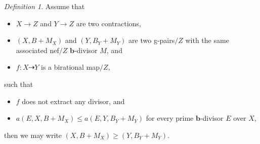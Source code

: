\documentclass[11pt]{amsart}
\numberwithin{equation}{section}
\newcommand{\bb}{\bm{b}}
\theoremstyle{definition}
\theoremstyle{remark}
\newtheorem{defn}[thm]{Definition}
\theoremstyle{definition}
\begin{document}
\begin{defn}
Assume that
\begin{itemize}
    \item $X\rightarrow Z$ and $Y\rightarrow Z$ are two contractions,
    \item $(X,B+M_X)$ and $(Y,B_Y+M_Y)$ are two g-pairs$/Z$ with the same associated nef$/Z$ $\bb$-divisor $M$, and
    \item $f: X\dashrightarrow Y$ is a birational map$/Z$,
\end{itemize}
such that
\begin{itemize}
    \item $f$ does not extract any divisor, and
    \item $a(E,X,B+M_X)\leq a(E,Y,B_Y+M_Y)$ for every prime $\bb$-divisor $E$ over $X$,
\end{itemize}
then we may write $(X,B+M_X)\geq (Y,B_Y+M_Y)$.
\end{defn}
\end{document}
